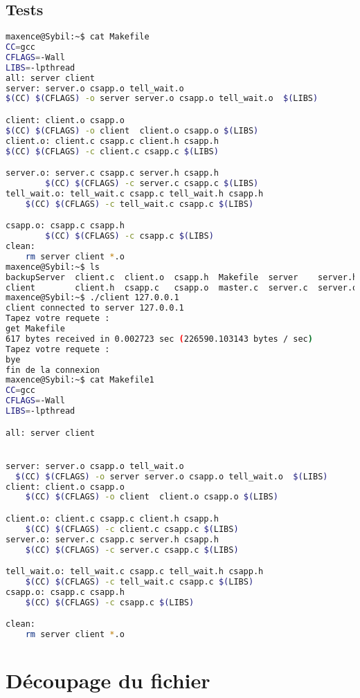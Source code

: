 \documentclass{report}
\begin{document}
      \section{Tests}
\begin{lstlisting}[frame=single,basicstyle=\footnotesize,language=bash]
maxence@Sybil:~$ cat Makefile
CC=gcc
CFLAGS=-Wall
LIBS=-lpthread
all: server client
server: server.o csapp.o tell_wait.o
$(CC) $(CFLAGS) -o server server.o csapp.o tell_wait.o  $(LIBS)

client: client.o csapp.o
$(CC) $(CFLAGS) -o client  client.o csapp.o $(LIBS)
client.o: client.c csapp.c client.h csapp.h
$(CC) $(CFLAGS) -c client.c csapp.c $(LIBS)

server.o: server.c csapp.c server.h csapp.h
		$(CC) $(CFLAGS) -c server.c csapp.c $(LIBS)
tell_wait.o: tell_wait.c csapp.c tell_wait.h csapp.h
	$(CC) $(CFLAGS) -c tell_wait.c csapp.c $(LIBS)

csapp.o: csapp.c csapp.h
		$(CC) $(CFLAGS) -c csapp.c $(LIBS)
clean:
  	rm server client *.o
maxence@Sybil:~$ ls
backupServer  client.c  client.o  csapp.h  Makefile  server    server.h  tell_wait.c  tell_wait.o  test_pipe.c
client        client.h  csapp.c   csapp.o  master.c  server.c  server.o  tell_wait.h  test
maxence@Sybil:~$ ./client 127.0.0.1
client connected to server 127.0.0.1
Tapez votre requete :
get Makefile
617 bytes received in 0.002723 sec (226590.103143 bytes / sec)
Tapez votre requete :
bye
fin de la connexion
maxence@Sybil:~$ cat Makefile1
CC=gcc
CFLAGS=-Wall
LIBS=-lpthread

all: server client


server: server.o csapp.o tell_wait.o
  $(CC) $(CFLAGS) -o server server.o csapp.o tell_wait.o  $(LIBS)
client: client.o csapp.o
	$(CC) $(CFLAGS) -o client  client.o csapp.o $(LIBS)

client.o: client.c csapp.c client.h csapp.h
	$(CC) $(CFLAGS) -c client.c csapp.c $(LIBS)
server.o: server.c csapp.c server.h csapp.h
	$(CC) $(CFLAGS) -c server.c csapp.c $(LIBS)

tell_wait.o: tell_wait.c csapp.c tell_wait.h csapp.h
	$(CC) $(CFLAGS) -c tell_wait.c csapp.c $(LIBS)
csapp.o: csapp.c csapp.h
	$(CC) $(CFLAGS) -c csapp.c $(LIBS)

clean:
	rm server client *.o
\end{lstlisting}

    \chapter{D\'ecoupage du fichier}
\end{document}
